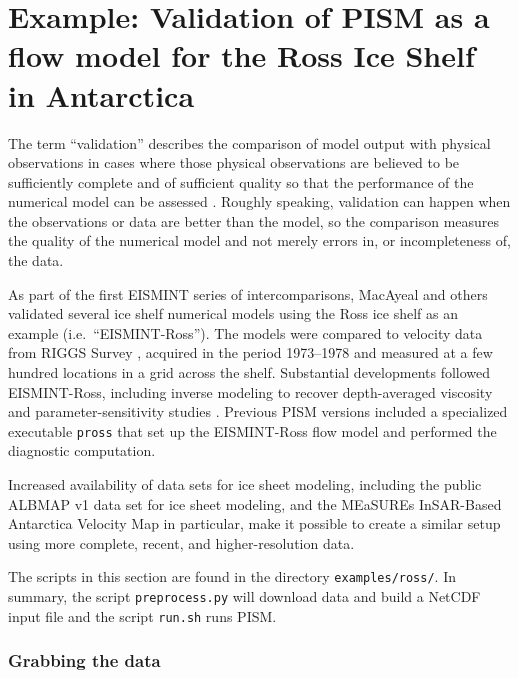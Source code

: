 
\section{Example: Validation of PISM as a flow model for the Ross Ice Shelf in Antarctica}\label{sec:ross}   

The term ``validation'' describes the comparison of model output with physical observations in cases where those physical observations are believed to be sufficiently complete and of sufficient quality so that the performance of the numerical model can be assessed \cite{Roache,Wesseling}.  Roughly speaking, validation can happen when the observations or data are better than the model, so the comparison measures the quality of the numerical model and not merely errors in, or incompleteness of, the data.

As part of the first EISMINT series of intercomparisons, MacAyeal and others \cite{MacAyealetal} validated several ice shelf numerical models using the Ross ice shelf as an example (i.e.~``EISMINT-Ross'').  The models were compared to velocity data from RIGGS Survey \cite{RIGGS2,RIGGS1}, acquired in the period 1973--1978 and measured at a few hundred locations in a grid across the shelf.  Substantial developments followed EISMINT-Ross, including inverse modeling to recover depth-averaged viscosity \cite{RommelaereMacAyeal} and parameter-sensitivity studies \cite{HumbertGreveHutter}.  Previous PISM versions included a specialized executable \texttt{pross} that set up the EISMINT-Ross flow model and performed the diagnostic computation.

Increased availability of data sets for ice sheet modeling, including the public ALBMAP v1 \cite{LeBrocqetal2010} data set for ice sheet modeling, and the MEaSUREs InSAR-Based Antarctica Velocity Map \cite{Rignotetal2011} in particular, make it possible to create a similar setup using more complete, recent, and higher-resolution data.

The scripts in this section are found in the directory \texttt{examples/ross/}.  In summary, the script \texttt{preprocess.py} will download data and build a NetCDF input file and the script \texttt{run.sh} runs PISM.


\subsubsection*{Grabbing the data}

